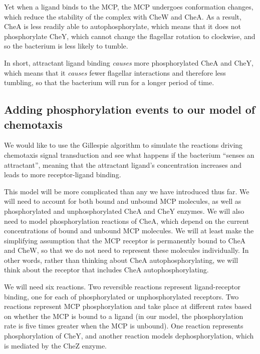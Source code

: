 Yet when a ligand binds to the MCP, the MCP undergoes conformation changes, which reduce the stability of the complex with CheW and CheA. As a result, CheA is less readily able to autophosphorylate, which means that it does not phosphorylate CheY, which cannot change the flagellar rotation to clockwise, and so the bacterium is less likely to tumble.

In short, attractant ligand binding \textit{causes} more phosphorylated CheA and CheY, which means that it \textit{causes} fewer flagellar interactions and therefore less tumbling, so that the bacterium will run for a longer period of time.\\

\begin{note}\end{note}


\FloatBarrier
{}
\subsection{Adding phosphorylation events to our model of chemotaxis}

We would like to use the Gillespie algorithm to simulate the reactions driving chemotaxis signal transduction and see what happens if the bacterium ``senses an attractant'', meaning that the attractant ligand's concentration increases and leads to more receptor-ligand binding.

This model will be more complicated than any we have introduced thus far. We will need to account for both bound and unbound MCP molecules, as well as phosphorylated and unphosphorylated CheA and CheY enzymes. We will also need to model phosphorylation reactions of CheA, which depend on the current concentrations of bound and unbound MCP molecules. We will at least make the simplifying assumption that the MCP receptor is permanently bound to CheA and CheW, so that we do not need to represent these molecules individually. In other words, rather than thinking about CheA autophosphorylating, we will think about the receptor that includes CheA autophosphorylating.

We will need six reactions. Two reversible reactions represent ligand-receptor binding, one for each of phosphorylated or unphosphorylated receptors. Two reactions represent MCP phosphorylation and take place at different rates based on whether the MCP is bound to a ligand (in our model, the phosphorylation rate is five times greater when the MCP is unbound). One reaction represents phosphorylation of CheY, and another reaction models dephosphorylation, which is mediated by the CheZ enzyme.

